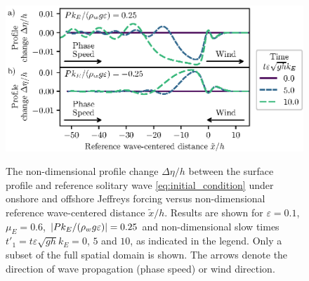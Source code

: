 \documentclass{jfm}
\renewcommand*{\epsilon}{\varepsilon}
\begin{document}
\begin{figure}
  \centering
  { %
    \label{fig:snapshots_solitary_tail:a}
    \label{fig:snapshots_solitary_tail:b}
  }
  \includegraphics{Snapshots-Positive-Negative-Tail.eps}
  \caption{
    The non-dimensional profile change $\Delta \eta/h$ between the
    surface profile and reference solitary wave
    \cref{eq:initial_condition} under
     onshore and
     offshore Jeffreys forcing
    versus non-dimensional reference wave-centered distance
    $\tilde{x}/h$.
    Results are shown for $\epsilon=0.1$, $\mu_E = 0.6$, $\abs{P
    k_E/(\rho_w g \epsilon)} = 0.25$ and non-dimensional slow times
    $t'_1 = t \epsilon \sqrt{gh} k_E = 0$, $5$ and $10$, as indicated
    in the legend.
    Only a subset of the full spatial domain is shown.
    The arrows denote the direction of wave propagation (phase speed) or
    wind direction.
  }\label{fig:snapshots_solitary_tail}
\end{figure}
\end{document}
